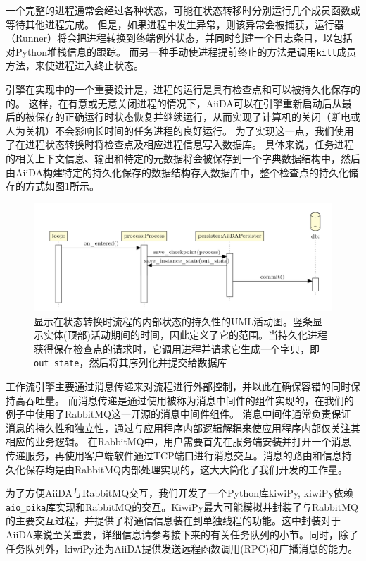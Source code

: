 一个完整的进程通常会经过各种状态，可能在状态转移时分别运行几个成员函数或等待其他进程完成。
但是，如果进程中发生异常，则该异常会被捕获，运行器（Runner）将会把进程转换到终端例外状态，并同时创建一个日志条目，以包括对Python堆栈信息的跟踪。
而另一种手动使进程提前终止的方法是调用\texttt{kill}成员方法，来使进程进入终止状态。

引擎在实现中的一个重要设计是，进程的运行是具有检查点和可以被持久化保存的的。
这样，在有意或无意关闭进程的情况下，AiiDA可以在引擎重新启动后从最后的被保存的正确运行时状态恢复并继续运行，从而实现了计算机的关闭（断电或人为关机）不会影响长时间的任务进程的良好运行。
为了实现这一点，我们使用了在进程状态转换时将检查点及相应进程信息写入数据库。
具体来说，任务进程的相关上下文信息、输出和特定的元数据将会被保存到一个字典数据结构中，然后由AiiDA构建特定的持久化保存的数据结构存入数据库中，整个检查点的持久化储存的方式如图\ref{fig:persister}所示。

\begin{figure}
  \includegraphics[width=1.0\textwidth]{figs/persister.png}
  \centering
  \caption{显示在状态转换时流程的内部状态的持久性的UML活动图。竖条显示实体(顶部)活动期间的时间，因此定义了它的范围。当持久化进程获得保存检查点的请求时，它调用进程并请求它生成一个字典，即\texttt{out\_state}，然后将其序列化并提交给数据库}
  \label{fig:persister}
\end{figure}

工作流引擎主要通过消息传递来对流程进行外部控制，并以此在确保容错的同时保持高吞吐量。
而消息传递是通过使用被称为消息中间件的组件实现的，在我们的例子中使用了RabbitMQ这一开源的消息中间件组件。
消息中间件通常负责保证消息的持久性和独立性，通过与应用程序内部逻辑解耦来使应用程序内部仅关注其相应的业务逻辑。
在RabbitMQ中，用户需要首先在服务端安装并打开一个消息传递服务，再使用客户端软件通过TCP端口进行消息交互。消息的路由和信息持久化保存均是由RabbitMQ内部处理实现的，这大大简化了我们开发的工作量。

为了方便AiiDA与RabbitMQ交互，我们开发了一个Python库kiwiPy, kiwiPy依赖\texttt{aio\_pika}库实现和RabbitMQ的交互。KiwiPy最大可能模拟并封装了与RabbitMQ的主要交互过程，并提供了将通信信息装在到单独线程的功能。这中封装对于AiiDA来说至关重要，详细信息请参考接下来的有关任务队列的小节。同时，除了任务队列外，kiwiPy还为AiiDA提供发送远程函数调用(RPC)和广播消息的能力。

